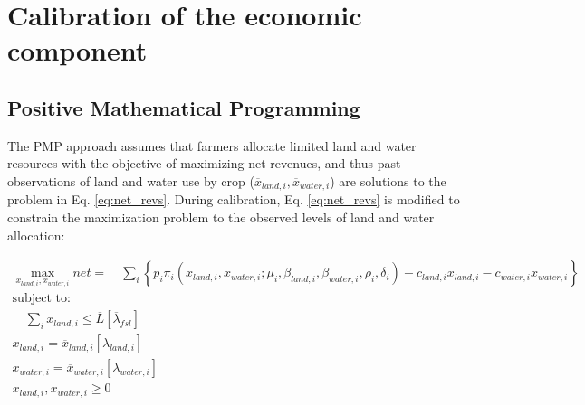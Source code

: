 \section{Calibration of the economic component}

\subsection{Positive Mathematical Programming}

The PMP approach assumes that farmers allocate limited land and water resources with the objective of maximizing net revenues, and thus past observations of land and water use by crop ($\overline{x}_{land,i}, \overline{x}_{water,i}$) are solutions to the problem in Eq. \eqref{eq:net_revs}. During calibration, Eq. \eqref{eq:net_revs} is modified to constrain the maximization problem to the observed levels of land and water allocation:

\begin{multline}\label{eq:net_revs_calib}
        \max_{ x_{land,i} , x_{water,i} } net = \quad \sum_i \left\{ p_i \pi_i\left( x_{land,i}, x_{water,i}; \mu_i, \beta_{land,i},\beta_{water,i}, \rho_{i}, \delta_{i} \right) -  c_{land,i} x_{land,i} - c_{water,i} x_{water,i} \right\} \\
    \text{subject to: }\\ \quad\sum_{i} x_{land,i} \leq \overline{L} \left[ \overline{ \lambda }_{fsl} \right]\\
    x_{land,i} = \overline{x}_{land,i} \left[ { \lambda }_{land,i} \right]\\
    x_{water,i} = \overline{x}_{water,i} \left[ { \lambda }_{water,i} \right]\\
    x_{land,i} , x_{water,i} \geq 0\\
\end{multline}


